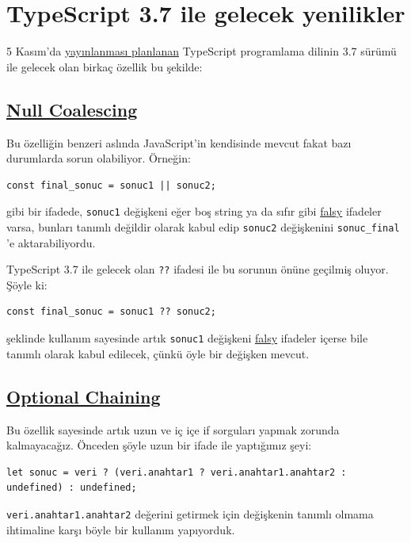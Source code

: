 \documentclass[11pt]{article}
\begin{document}
\section{TypeScript 3.7 ile gelecek yenilikler}
\label{sec:org4c10f01}
5 Kasım'da \href{https://github.com/microsoft/TypeScript/issues/33352}{yayınlanması planlanan} TypeScript programlama dilinin 3.7 sürümü
ile gelecek olan birkaç özellik bu şekilde:

\subsection{\href{https://github.com/microsoft/TypeScript/issues/26578}{Null Coalescing}}
\label{sec:org6a723cb}
Bu özelliğin benzeri aslında JavaScript'in kendisinde mevcut fakat bazı
durumlarda sorun olabiliyor. Örneğin:
\begin{verbatim}
const final_sonuc = sonuc1 || sonuc2;
\end{verbatim}
gibi bir ifadede, \texttt{sonuc1} değişkeni eğer boş string ya da sıfır gibi \href{https://developer.mozilla.org/en-US/docs/Glossary/Falsy}{falsy}
ifadeler varsa, bunları tanımlı değildir olarak kabul edip \texttt{sonuc2}
değişkenini \texttt{sonuc\_final} 'e aktarabiliyordu.

TypeScript 3.7 ile gelecek olan \texttt{??} ifadesi ile bu sorunun önüne geçilmiş
oluyor. Şöyle ki:
\begin{verbatim}
const final_sonuc = sonuc1 ?? sonuc2;
\end{verbatim}
şeklinde kullanım sayesinde artık \texttt{sonuc1} değişkeni \href{https://developer.mozilla.org/en-US/docs/Glossary/Falsy}{falsy} ifadeler içerse
bile tanımlı olarak kabul edilecek, çünkü öyle bir değişken mevcut.
\subsection{\href{https://github.com/microsoft/TypeScript/issues/16}{Optional Chaining}}
\label{sec:org9e33b09}
Bu özellik sayesinde artık uzun ve iç içe if sorguları yapmak zorunda
kalmayacağız. Önceden şöyle uzun bir ifade ile yaptığımız şeyi:
\begin{verbatim}
let sonuc = veri ? (veri.anahtar1 ? veri.anahtar1.anahtar2 : undefined) : undefined;
\end{verbatim}
\texttt{veri.anahtar1.anahtar2} değerini getirmek için değişkenin tanımlı olmama
ihtimaline karşı böyle bir kullanım yapıyorduk.
\end{document}
